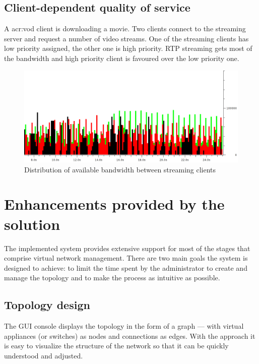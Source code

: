 \documentclass[11pt]{book}
\begin{document}
      \subsection{Client-dependent quality of service}
      \label{sub:uc:client}

        A \gls{acr:vod} client is downloading a movie. Two clients connect to the streaming server and request a number of video
        streams. One of the streaming clients has low priority assigned, the other one is high priority. RTP streaming
        gets most of the bandwidth and high priority client is favoured over the low priority one.

        \begin{figure}[H]
          \begin{center}
            \includegraphics[width=.7\textwidth]{img/test-case/exp-all.png}
          \end{center}

          \caption{Distribution of available bandwidth between streaming clients}
        \end{figure}


    \section{Enhancements provided by the solution}
    \label{sec:uc:enhance}

      The implemented system provides extensive support for most of the stages that comprise virtual network management.
      There are two main goals the system is designed to achieve: to limit the time spent by the administrator to create
      and manage the topology and to make the process as intuitive as possible.


      \subsection{Topology design}
      \label{sub:uc:enhance:design}

        The GUI console displays the topology in the form of a graph --- with virtual appliances (or switches) as nodes
        and connections as edges. With the approach it is easy to visualize the structure of the network so that it can
        be quickly understood and adjusted.
\end{document}
